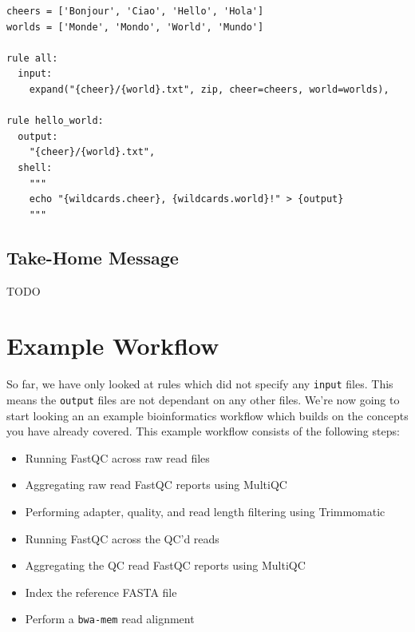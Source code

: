 \begin{bonus}
\begin{lstlisting}
cheers = ['Bonjour', 'Ciao', 'Hello', 'Hola']
worlds = ['Monde', 'Mondo', 'World', 'Mundo']

rule all:
  input:
    expand("{cheer}/{world}.txt", zip, cheer=cheers, world=worlds),

rule hello_world:
  output:
    "{cheer}/{world}.txt",
  shell:
    """
    echo "{wildcards.cheer}, {wildcards.world}!" > {output}
    """
\end{lstlisting}

\end{bonus}

\subsection{Take-Home Message}

TODO

\section{Example Workflow}

So far, we have only looked at rules which did not specify any \texttt{input} files. This means the \texttt{output} files are not dependant on any other files.
We're now going to start looking an an example bioinformatics workflow which builds on the concepts you have already covered. This example workflow consists
of the following steps:

\begin{itemize}
  \item Running FastQC across raw read files
  \item Aggregating raw read FastQC reports using MultiQC
  \item Performing adapter, quality, and read length filtering using Trimmomatic
  \item Running FastQC across the QC'd reads
  \item Aggregating the QC read FastQC reports using MultiQC
  \item Index the reference FASTA file
  \item Perform a \texttt{bwa-mem} read alignment
\end{itemize}

